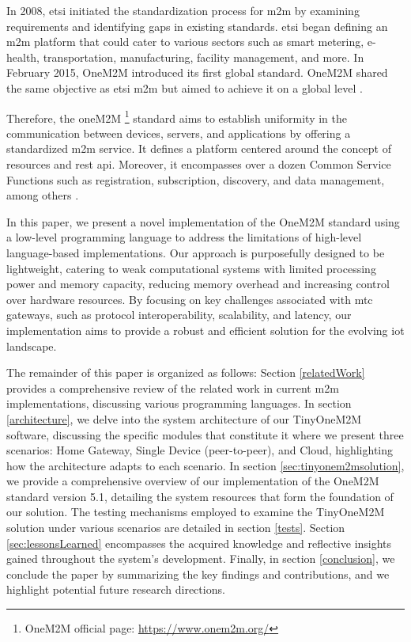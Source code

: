 \documentclass[a4paper,fleqn]{cas-dc}
\begin{document}
In 2008, \gls{etsi} initiated the standardization process for \gls{m2m} by examining requirements and identifying gaps in existing standards. \gls{etsi} began defining an \gls{m2m} platform that could cater to various sectors such as smart metering, e-health, transportation, manufacturing, facility management, and more. In February 2015, OneM2M introduced its first global standard. OneM2M shared the same objective as \gls{etsi} \gls{m2m} but aimed to achieve it on a global level \cite{pticek_architecture_2015}. 

Therefore, the oneM2M \footnote{OneM2M official page: \url{https://www.onem2m.org/}} standard aims to establish uniformity in the communication between devices, servers, and applications by offering a standardized \gls{m2m} service. It defines a platform centered around the concept of resources and \gls{rest} \gls{api}. Moreover, it encompasses over a dozen Common Service Functions such as registration, subscription, discovery, and data management, among others \cite{onem2m_standard}.

In this paper, we present a novel implementation of the OneM2M standard using a low-level programming language to address the limitations of high-level language-based implementations. Our approach is purposefully designed to be lightweight, catering to weak computational systems with limited processing power and memory capacity, reducing memory overhead and increasing control over hardware resources. By focusing on key challenges associated with \gls{mtc} gateways, such as protocol interoperability, scalability, and latency, our implementation aims to provide a robust and efficient solution for the evolving \gls{iot} landscape.

The remainder of this paper is organized as follows: Section \ref{relatedWork} provides a comprehensive review of the related work in current \gls{m2m} implementations, discussing various programming languages. In section \ref{architecture}, we delve into the system architecture of our TinyOneM2M software, discussing the specific modules that constitute it where we present three scenarios: Home Gateway, Single Device (peer-to-peer), and Cloud, highlighting how the architecture adapts to each scenario. In section \ref{sec:tinyonem2msolution}, we provide a comprehensive overview of our implementation of the OneM2M standard version 5.1, detailing the system resources that form the foundation of our solution. The testing mechanisms employed to examine the TinyOneM2M solution under various scenarios are detailed in section \ref{tests}. Section \ref{sec:lessonsLearned} encompasses the acquired knowledge and reflective insights gained throughout the system's development. Finally, in section \ref{conclusion}, we conclude the paper by summarizing the key findings and contributions, and we highlight potential future research directions.
\end{document}
